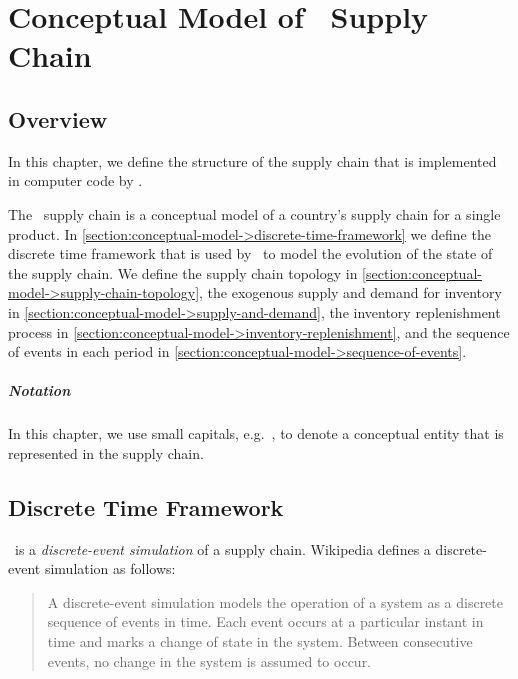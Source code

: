 \chapter[Conceptual Model (\scs)]{Conceptual Model of \scs\ Supply Chain}
\label{chapter:conceptual-model}


\section{Overview}
\label{section:conceptual-model->overview}

In this chapter,
we define the structure of the supply chain
that is implemented in computer code by \scs.

The \scs\ supply chain is a conceptual model of
a country's supply chain for a single product.
In \autoref{section:conceptual-model->discrete-time-framework}
we define the discrete time framework that is used by \scs\
to model the evolution of the state of the supply chain.
We define the supply chain topology
in \autoref{section:conceptual-model->supply-chain-topology},
the exogenous supply and demand for inventory
in \autoref{section:conceptual-model->supply-and-demand},
the inventory replenishment process
in \autoref{section:conceptual-model->inventory-replenishment},
and the sequence of events in each period in
\autoref{section:conceptual-model->sequence-of-events}.

\paragraph{Notation}
In this chapter,
we use small capitals, e.g.\ ,
to denote a conceptual entity that is represented in the supply chain.





\section{Discrete Time Framework}
\label{section:conceptual-model->discrete-time-framework}

\scs\ is a \emph{discrete-event simulation} of a supply chain.
Wikipedia defines a discrete-event simulation as follows:
\begin{quotation}
A discrete-event simulation models the operation of a system
as a discrete sequence of events in time.
Each event occurs at a particular instant in time
and marks a change of state in the system.
Between consecutive events, no change in the system is assumed to occur.
\end{quotation}

